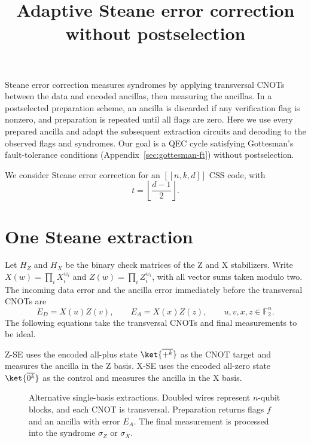 \documentclass[11pt,a4paper]{article}
\title{Adaptive Steane error correction without postselection}
\author{}
\date{}
\theoremstyle{definition}
\begin{document}
\maketitle

\noindent
Steane error correction measures syndromes by applying transversal CNOTs
between the data and encoded ancillas, then measuring the ancillas. In a
postselected preparation scheme, an ancilla is discarded if any verification flag is
nonzero, and preparation is repeated until all flags are zero. Here we use
every prepared ancilla and adapt the subsequent extraction circuits and
decoding to the observed flags and syndromes. Our goal is a QEC cycle
satisfying Gottesman's fault-tolerance conditions
(Appendix~\ref{sec:gottesman-ft}) without postselection.

We consider Steane error correction for an $[[n,k,d]]$ CSS code, with
\[
  t=\left\lfloor\frac{d-1}{2}\right\rfloor.
\]
\section{One Steane extraction}
\label{sec:extraction}

Let $H_Z$ and $H_X$ be the binary check matrices of the Z and X
stabilizers. Write $X(w)=\prod_i X_i^{w_i}$ and
$Z(w)=\prod_i Z_i^{w_i}$, with all vector sums taken modulo two.
The incoming data error and the ancilla error immediately before the
transversal CNOTs are
\[
    E_D=X(u)Z(v),\qquad E_A=X(x)Z(z),
    \qquad u,v,x,z\in\mathbb F_2^n.
\]
The following equations take the transversal CNOTs and final measurements
to be ideal.

Z-SE uses the encoded all-plus state $\ket{\overline{+^k}}$ as the CNOT
target and measures the ancilla in the Z basis. X-SE uses the encoded all-zero state
$\ket{\overline{0^k}}$ as the control and measures the ancilla in the X basis.

\begin{figure}[htbp]
    \centering
    \begin{minipage}{0.48\textwidth}
        \centering
    \end{minipage}\hfill
    \begin{minipage}{0.48\textwidth}
        \centering
    \end{minipage}
    \caption{Alternative single-basis extractions. Doubled wires represent
    $n$-qubit blocks, and each CNOT is transversal. Preparation returns
    flags $f$ and an ancilla with error $E_A$. The final measurement is
    processed into the syndrome $\sigma_Z$ or $\sigma_X$.}
    \label{fig:steane-extractions}
\end{figure}
\end{document}
